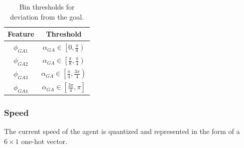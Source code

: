 \begin{table}[htbp]
    \label{deviation-from-goal-bins}
    \begin{center}
        \renewcommand{\arraystretch}{1.3}
        \begin{tabular}{|c|c|}
            \hline
            Feature & Threshold \\
            \hline
            $\phi_{GA1}$ & $\alpha_{GA} \in \left[ 0 , \frac{\pi}{8} \right)$ \\
            
            $\phi_{GA2}$ & $\alpha_{GA} \in \left[ \frac{\pi}{8} , \frac{\pi}{4} \right)$ \\
            
            $\phi_{GA3}$ & $\alpha_{GA} \in \left[ \frac{\pi}{4} , \frac{3\pi}{4} \right)$ \\
            
            $\phi_{GA4}$ & $\alpha_{GA} \in \left[ \frac{3\pi}{4} , \pi \right]$ \\
            \hline
        \end{tabular}
        \caption{Bin thresholds for deviation from the goal.}
    \end{center}
\end{table}

\subsubsection*{Speed}
The current speed of the agent is quantized and represented in the form of a $6 \times 1$ one-hot vector. 

